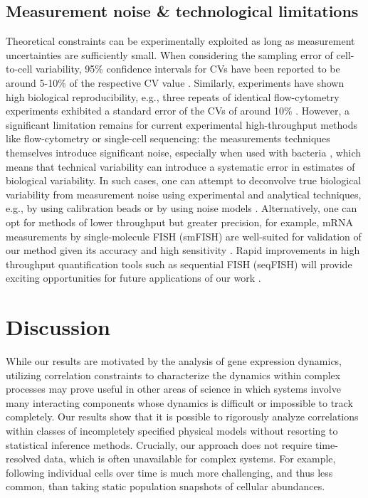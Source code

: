 \documentclass[%
 reprint,prx,
superscriptaddress,
%
%
%
%
%
%
%
%
%
 amsmath,amssymb,
 aps,
%
%
%
%
%
%
]{revtex4-2}
\begin{document}
\vspace{-.5em}
{
\subsection{Measurement noise \& technological limitations}\vspace{-.75em}
%
Theoretical constraints can be experimentally exploited as long as measurement uncertainties are sufficiently small. When considering the sampling error of cell-to-cell variability, 95\% confidence intervals for CVs have been reported to be around 5-10\% of the respective CV value \cite{Elowitz2002, raj2006stochastic}. %
%
%
%
Similarly, experiments have shown high biological reproducibility, e.g., three repeats of identical flow-cytometry experiments exhibited a standard error of the CVs of around 10\% \cite{Balleza2018}. 
However, a significant limitation remains for current experimental high-throughput methods like flow-cytometry or single-cell sequencing: the measurements techniques themselves introduce significant noise, especially when used with bacteria \cite{galbusera2020using,grun2014validation}, which means that technical variability can introduce a systematic error in estimates of biological variability. 
%
%
%
In such cases, one can attempt to deconvolve true biological variability from measurement noise using experimental and analytical techniques, e.g., by using calibration beads \cite{galbusera2020using} or by using noise models \cite{grun2014validation}. Alternatively, one can opt for methods of lower throughput but greater precision, for example, mRNA measurements by single-molecule FISH (smFISH) are well-suited for validation of our method given its accuracy and high sensitivity \cite{raj2008imaging}. 
Rapid improvements in high throughput quantification tools such as sequential FISH (seqFISH) will provide exciting opportunities for future applications of our work \cite{eng2019transcriptome}.
%
%
%
}

\section{Discussion}
\vspace{-1em}
%
%

While our results are motivated by the analysis of gene expression dynamics, utilizing correlation constraints to characterize the dynamics within complex processes may prove useful in other areas of science in which systems involve many interacting components whose dynamics is difficult or impossible to track completely. 
%
%
%
Our results show that it is possible to rigorously analyze correlations within classes of incompletely specified physical models without resorting to statistical inference methods. Crucially, our approach does not require time-resolved data, which is often unavailable for complex systems. For example, following individual cells over time is much more challenging, and thus less common, than taking static population snapshots of cellular abundances. 
\end{document}
